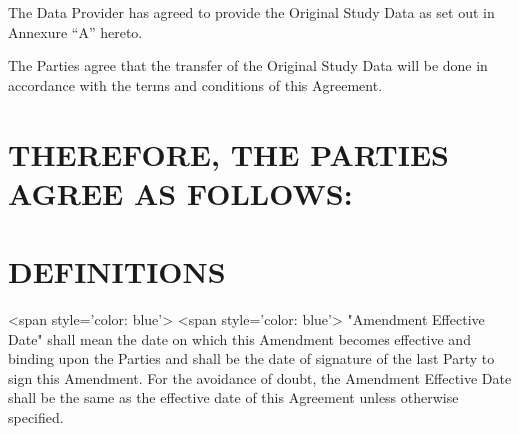 \documentclass[12pt,letterpaper]{article}
\begin{document}
The Data Provider has agreed to provide the Original Study Data as set out in Annexure “A” hereto.

The Parties agree that the transfer of the Original Study Data will be done in accordance with the terms and conditions of this Agreement.

\section*{THEREFORE, THE PARTIES AGREE AS FOLLOWS:}

\section*{DEFINITIONS}

<span style='color: blue'> <span style='color: blue'> "Amendment Effective Date" shall mean the date on which this Amendment becomes effective and binding upon the Parties and shall be the date of signature of the last Party to sign this Amendment. For the avoidance of doubt, the Amendment Effective Date shall be the same as the effective date of this Agreement unless otherwise specified.
\end{document}
